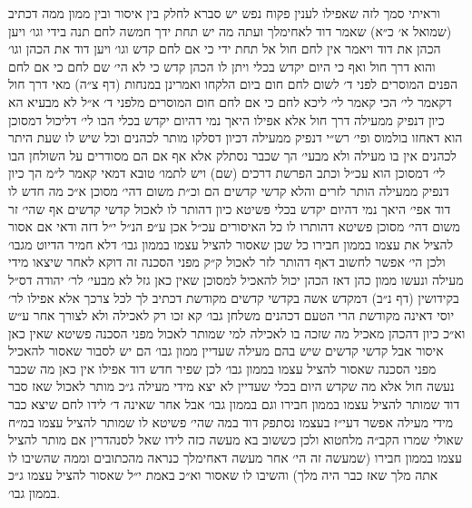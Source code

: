 \documentclass[12pt, openany]{book}
\begin{document}
\begin{multicols}{2}
וראיתי סמך לזה שאפילו לענין פקוח נפש יש סברא לחלק בין איסור ובין ממון ממה דכתיב (שמואל א׳ כ״א) שאמר דוד לאחימלך ועתה מה יש תחת ידך חמשה לחם תנה בידי וגו׳ ויען הכהן את דוד ויאמר אין לחם חול אל תחת ידי כי אם לחם קדש וגו׳ ויען דוד את הכהן וגו׳ והוא דרך חול ואף כי היום יקדש בכלי ויתן לו הכהן קדש כי לא הי׳ שם לחם כי אם לחם הפנים המוסרים לפני ד׳ לשום לחם חום ביום הלקחו ואמרינן במנחות (דף צ״ה) מאי דרך חול דקאמר לי׳ הכי קאמר לי׳ ליכא לחם כי אם לחם חום המוסרים מלפני ד׳ א״ל לא מבעיא הא כיון דנפיק ממעילה דרך חול אלא אפילו היאך נמי דהיום יקדש בכלי הבו לי׳ דליכול דמסוכן הוא דאחזו בולמוס ופי׳ רש״י דנפיק ממעילה דכיון דסלקו מותר לכהנים וכל שיש לו שעת היתר לכהנים אין בו מעילה ולא מבעי׳ הך שכבר נסתלק אלא אף אם הם מסודרים על השולחן הבו לי׳ דמסוכן הוא עכ״ל וכתב הפרשת דרכים (שם) ויש לתמו׳ טובא דמאי קאמר ל״מ הך כיון דנפיק ממעילה הותר לזרים והלא קדשי קדשים הם וכ״ת משום דהי׳ מסוכן א״כ מה חדש לו דוד אפי׳ היאך נמי דהיום יקדש בכלי פשיטא כיון דהותר לו לאכול קדשי קדשים אף שהי׳ זר משום דהי׳ מסוכן פשיטא דהותרו לו כל האיסורים עכ״ל אכן ע״פ הנ״ל י״ל דזה ודאי אם אסור להציל את עצמו בממון חבירו כל שכן שאסור להציל עצמו בממון גבו׳ דלא חמיר הדיוט מגבו׳ ולכן הי׳ אפשר לחשוב דאף דהותר לזר לאכול ק״ק מפני הסכנה זה דוקא לאחר שיצאו מידי מעילה ונעשו ממון כהן דאז הכהן יכול להאכיל למסוכן שאין כאן גזל לא מבעי׳ לר׳ יהודה דס״ל בקידושין (דף נ״ב) דמקדש אשה בקדשי קדשים מקודשת דכתיב לך לכל צרכך אלא אפילו לר׳ יוסי דאינה מקודשת הרי הטעם דכהנים משלחן גבו׳ קא זכו רק לאכילה ולא לצורך אחר ע״ש וא״כ כיון דהכהן מאכיל מה שזכה בו לאכילה למי שמותר לאכול מפני הסכנה פשיטא שאין כאן איסור אבל קדשי קדשים שיש בהם מעילה שעדיין ממון גבו׳ הם יש לסבור שאסור להאכיל מפני הסכנה שאסור להציל עצמו בממון גבו׳ לכן שפיר חדש דוד אפילו אין כאן מה שכבר נעשה חול אלא מה שקדש היום בכלי שעדיין לא יצא מידי מעילה ג״כ מותר לאכול שאז סבר דוד שמותר להציל עצמו בממון חבירו וגם בממון גבו׳ אבל אחר שאינה ד׳ לידו לחם שיצא כבר מידי מעילה אפשר דעי״ז בעצמו נסתפק דוד במה שהי׳ פשיטא לו שמותר להציל עצמו במ״ח שאולי שמרו הקב״ה מלחטוא ולכן כששוב בא מעשה כזה לידו שאל לסנהדרין אם מותר להציל עצמו בממון חבירו (שמעשה זה הי׳ אחר מעשה דאחימלך כנראה מהכתובים וממה שהשיבו לו אתה מלך שאז כבר היה מלך) והשיבו לו שאסור וא״כ באמת י״ל שאסור להציל עצמו ג״כ בממון גבו׳.\\\vspace{0pt}


\end{multicols}
\end{document}
